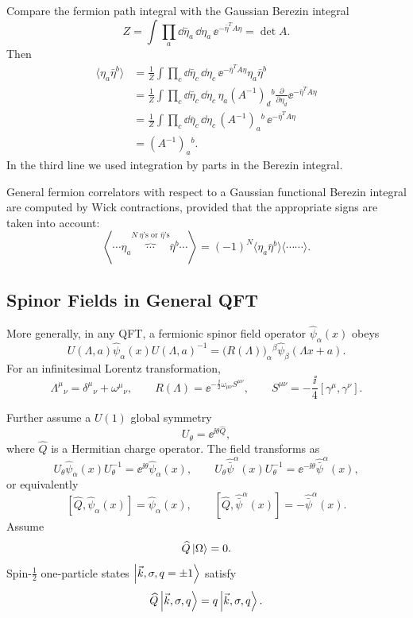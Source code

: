 Compare the fermion path integral with the Gaussian Berezin integral
\[
  Z
  =
  \int\prod_a\dd\bar\eta_a\,\dd\eta_a\,
  \ee^{-\bar\eta^T A\eta}
  =
  \det A.
\]
Then
\[
\begin{aligned}
  \langle \eta_a\bar\eta^b\rangle
  &=
  \frac1Z
  \int\prod_c\dd\bar\eta_c\,\dd\eta_c\,
  \ee^{-\bar\eta^TA\eta}\eta_a\bar\eta^b
  \\
  &=
  \frac1Z
  \int\prod_c\dd\bar\eta_c\,\dd\eta_c\,
  \eta_a(A^{-1})_d{}^b
  \frac{\partial}{\partial\eta_d}
  \ee^{-\bar\eta^TA\eta}
  \\
  &=
  \frac1Z
  \int\prod_c\dd\bar\eta_c\,\dd\eta_c\,
  (A^{-1})_a{}^b\,
  \ee^{-\bar\eta^TA\eta}
  \\
  &=
  (A^{-1})_a{}^b.
\end{aligned}
\]
In the third line we used integration by parts in the Berezin integral.

General fermion correlators with respect to a Gaussian functional
Berezin integral are computed by Wick contractions, provided that the
appropriate signs are taken into account:
\[
  \left\langle
    \cdots \eta_a
    \overbrace{\cdots}^{N\ \eta\text{'s or }\bar\eta\text{'s}}
    \bar\eta^b\cdots
  \right\rangle
  =
  (-1)^N
  \langle\eta_a\bar\eta^b\rangle
  \langle\cdots\cdots\rangle .
\]

\subsection{Spinor Fields in General QFT}

More generally, in any QFT, a fermionic spinor field operator
\(\widehat\psi_\alpha(x)\) obeys
\[
  U(\Lambda,a)\widehat\psi_\alpha(x)U(\Lambda,a)^{-1}
  =
  \bigl(R(\Lambda)\bigr)_\alpha{}^\beta
  \widehat\psi_\beta(\Lambda x+a).
\]
For an infinitesimal Lorentz transformation,
\[
  \Lambda^\mu{}_\nu=\delta^\mu{}_\nu+\omega^\mu{}_\nu,
  \qquad
  R(\Lambda)
  =
  \ee^{-\frac{\ii}{2}\omega_{\mu\nu}S^{\mu\nu}},
  \qquad
  S^{\mu\nu}=-\frac{\ii}{4}[\gamma^\mu,\gamma^\nu].
\]

Further assume a \(U(1)\) global symmetry
\[
  U_\theta=\ee^{\ii\theta\widehat Q},
\]
where \(\widehat Q\) is a Hermitian charge operator.  The field transforms
as
\[
  U_\theta\widehat\psi_\alpha(x)U_\theta^{-1}
  =
  \ee^{\ii\theta}\widehat\psi_\alpha(x),
  \qquad
  U_\theta\widehat{\bar\psi}^{\alpha}(x)U_\theta^{-1}
  =
  \ee^{-\ii\theta}\widehat{\bar\psi}^{\alpha}(x),
\]
or equivalently
\[
  [\widehat Q,\widehat\psi_\alpha(x)]
  =
  \widehat\psi_\alpha(x),
  \qquad
  [\widehat Q,\widehat{\bar\psi}^{\alpha}(x)]
  =
  -\widehat{\bar\psi}^{\alpha}(x).
\]
Assume
\[
  \widehat Q\ket\Omega=0.
\]
Spin-\(\frac12\) one-particle states
\(\ket{\vec k,\sigma,q=\pm1}\) satisfy
\[
  \widehat Q\ket{\vec k,\sigma,q}
  =
  q\ket{\vec k,\sigma,q}.
\]

